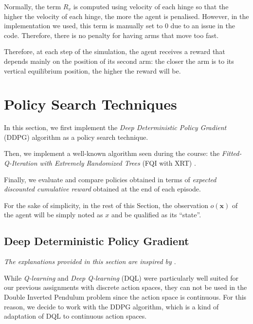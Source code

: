 \documentclass[a4paper, 12pt]{article}
\begin{document}
    \begin{note}
        Normally, the term $R_v$ is computed using velocity of each hinge so that the higher the velocity of each hinge, the more the agent is penalised. However, in the implementation we used, this term is manually set to $\num{0}$ due to an issue in the code. Therefore, there is no penalty for having arms that move too fast.
    \end{note}
    
    Therefore, at each step of the simulation, the agent receives a reward that depends mainly on the position of its second arm: the closer the arm is to its vertical equilibrium position, the higher the reward will be.
    
    \newpage
    
    \section{Policy Search Techniques}\label{sec:policy.search.techniques}
    
    In this section, we first implement the \emph{Deep Deterministic Policy Gradient} (DDPG) algorithm \cite{lillicrap2015continuous} as a policy search technique.

    Then, we implement a well-known algorithm seen during the course: the \emph{Fitted-Q-Iteration with Extremely Randomized Trees} (FQI with XRT) \cite{ernst2005tree}.
    
    Finally, we evaluate and compare policies obtained in terms of \emph{expected discounted cumulative reward} obtained at the end of each episode.
    
    \begin{note}
        For the sake of simplicity, in the rest of this Section, the observation $o(\bm{x})$ of the agent will be simply noted as $x$ and be qualified as its \enquote{state}.
    \end{note}
    
    \subsection{Deep Deterministic Policy Gradient}
    
    \emph{The explanations provided in this section are inspired by \cite{silver2014deterministic, lillicrap2015continuous, ddpgopenai, ddpgtds, bollandinfo80031, bollandinfo80032}}.
    
    While \emph{Q-learning} and \emph{Deep Q-learning} (DQL) were particularly well suited for our previous assignments with discrete action spaces, they can not be used in the Double Inverted Pendulum problem since the action space is continuous. For this reason, we decide to work with the DDPG algorithm, which is a kind of adaptation of DQL to continuous action spaces.
    
\end{document}

